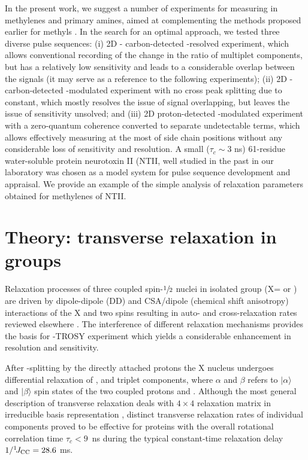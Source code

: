 \documentclass[twocolumn]{svjour3}           %
\begin{document}
In the present work, we suggest a number of experiments for measuring 
\gtwoXH{} in methylenes and primary amines, aimed at complementing the
methods proposed earlier for methyls 
\cite{zhang_probing_2006,lesovoy_nmr_2017}. 
In the search for an optimal approach, we tested three diverse pulse 
sequences: 
(i) 2D \hlab-\clab{} carbon-detected \oneJch-resolved experiment, 
which allows conventional recording of the change in the ratio of multiplet components, but has a relatively low sensitivity and leads to a considerable overlap between the signals (it may serve as a reference to the following experiments); 
(ii) 2D \hlab-\clab{} carbon-detected \oneJch-modulated experiment with 
no cross peak splitting due to \oneJch{} constant, which mostly resolves 
the issue of signal overlapping, but leaves the issue of sensitivity 
unsolved; and 
(iii) 2D proton-detected \oneJch-modulated experiment with a zero-quantum coherence converted to separate undetectable terms, 
which allows effectively measuring 
\gtwoXH{} at the most of side chain \XHtwo{} positions without any 
considerable loss of sensitivity and resolution. 
A small ($\tau_c \sim 3$ 
ns) 61-residue water-soluble protein neurotoxin II (NTII, well studied in the past 
in our laboratory 
\cite{lesovoy_specific_2009,bocharov_resonance_2003,krabben_loop_2009}
was chosen 
as a model system for pulse sequence development and appraisal. We provide an example of the simple analysis of relaxation parameters \gtwoCH{} obtained for methylenes of NTII.

\section{Theory: transverse relaxation in \XHtwo{} groups}
\label{sec:theory}


Relaxation processes of three coupled spin-$\sfrac{1}{2}$ nuclei in isolated 
\XHtwo{} group (X=\nlab{} or \clab{}) are driven by dipole-dipole (DD) and 
CSA\slash dipole (chemical shift ani\-so\-tro\-py) interactions of the X and 
two \hlab{} spins resulting in 
auto- and cross-relaxation rates reviewed elsewhere 
\cite{kumar_cross-correlations_2000,zheng_measurement_2004}. 
The interference of different relaxation mechanisms provides the basis for
\CHtwo-{TROSY} experiment \cite{miclet_relaxation-optimized_2004} which 
yields a considerable enhancement in resolution and sensitivity.

After \oneJxh-splitting by the directly 
attached protons the X nucleus undergoes differential relaxation of  
,  and  triplet components, where $\alpha$ and $\beta$
refers to $|\alpha\rangle$ and $|\beta\rangle$ spin states of the two coupled
protons \Hfirst{} and \Hprime{}.
Although the most general description of transverse relaxation deals with $4\times 4$ 
relaxation matrix in irreducible basis representation 
\cite{kay_heteronuclear_1992,prestegard_characterization_1978},
distinct transverse relaxation rates of individual components proved
to be effective \cite{zheng_measurement_2004} for proteins with the 
overall rotational correlation time $\tau_c < 9$~ns during the typical 
constant-time relaxation delay $1/^1\!J_{\text{CC}} = 28.6$ ms.
\end{document}
